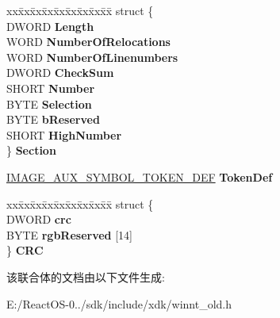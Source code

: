 \begin{DoxyCompactItemize}
\begin{tabbing}
\end{tabbing}\item 
\mbox{\label{union___i_m_a_g_e___a_u_x___s_y_m_b_o_l_a9842f0c6302e10b9a8bc3fbc00df59b1}} 
\begin{tabbing}
xx\=xx\=xx\=xx\=xx\=xx\=xx\=xx\=xx\=\kill
struct \{\\
\>DWORD {\bfseries Length}\\
\>WORD {\bfseries NumberOfRelocations}\\
\>WORD {\bfseries NumberOfLinenumbers}\\
\>DWORD {\bfseries CheckSum}\\
\>SHORT {\bfseries Number}\\
\>BYTE {\bfseries Selection}\\
\>BYTE {\bfseries bReserved}\\
\>SHORT {\bfseries HighNumber}\\
\} {\bfseries Section}\\

\end{tabbing}\item 
\mbox{\label{union___i_m_a_g_e___a_u_x___s_y_m_b_o_l_ae64d715aff510acb5ec6f68fca38e280}} 
\hyperlink{struct_i_m_a_g_e___a_u_x___s_y_m_b_o_l___t_o_k_e_n___d_e_f}{I\+M\+A\+G\+E\+\_\+\+A\+U\+X\+\_\+\+S\+Y\+M\+B\+O\+L\+\_\+\+T\+O\+K\+E\+N\+\_\+\+D\+EF} {\bfseries Token\+Def}
\item 
\mbox{\label{union___i_m_a_g_e___a_u_x___s_y_m_b_o_l_a4e103f0ad47e21c821d3f5e1f95efda8}} 
\begin{tabbing}
xx\=xx\=xx\=xx\=xx\=xx\=xx\=xx\=xx\=\kill
struct \{\\
\>DWORD {\bfseries crc}\\
\>BYTE {\bfseries rgbReserved} \mbox{[}14\mbox{]}\\
\} {\bfseries CRC}\\

\end{tabbing}\end{DoxyCompactItemize}


该联合体的文档由以下文件生成\+:\begin{DoxyCompactItemize}
\item 
E\+:/\+React\+O\+S-\/0../sdk/include/xdk/winnt\+\_\+old.\+h\end{DoxyCompactItemize}
